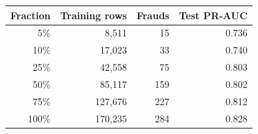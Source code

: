 \begin{tabular}{r r r r}
\hline
\textbf{Fraction} & \textbf{Training rows} & \textbf{Frauds} & \textbf{Test PR-AUC} \\
\hline
5\% & 8{,}511 & 15 & 0.736 \\
10\% & 17{,}023 & 33 & 0.740 \\
25\% & 42{,}558 & 75 & 0.803 \\
50\% & 85{,}117 & 159 & 0.802 \\
75\% & 127{,}676 & 227 & 0.812 \\
100\% & 170{,}235 & 284 & 0.828 \\
\hline
\end{tabular}
